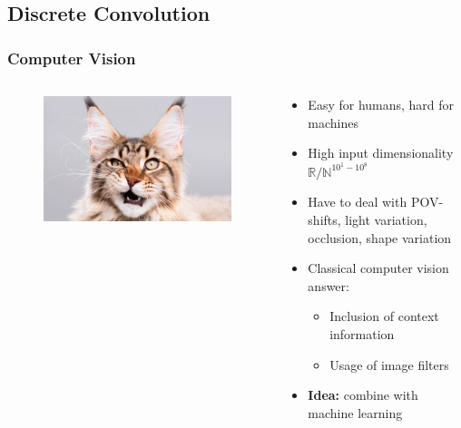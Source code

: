 \documentclass[aspectratio=1610]{beamer}
\newcommand\imageright[1]{ %
    \caption*{\scalebox{.5}{\textcolor{lightgray}{\textcopyright~#1}}} %
}
\begin{document}
\subsection{Discrete Convolution}
\label{subsec:discrete-convolution}

\begin{frame}
\frametitle{Computer Vision}

\begin{columns}
    \begin{column}{0.48\textwidth}
        \begin{figure}
            \centering
            \includegraphics[width=\linewidth]{cat.jpg}
            \imageright{Catster}
        \end{figure}
    \end{column}
    \begin{column}{0.48\textwidth}
        \begin{itemize}
            \item Easy for humans, hard for machines
            \item High input dimensionality $\mathbb{R}/\mathbb{N}^{10^1-10^8}$
            \item Have to deal with POV-shifts, light variation, occlusion, shape variation
            \item Classical computer vision answer:
            \begin{itemize}
                \item Inclusion of context information
                \item Usage of image filters
            \end{itemize}
            \item \textbf{Idea:} combine with machine learning
        \end{itemize}
    \end{column}
\end{columns}
\end{frame}
\end{document}
